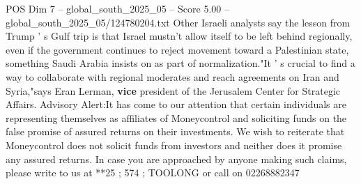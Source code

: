 \begin{textsample}{POS Dim 7 – global\_south\_2025\_05 – Score 5.00 – global\_south\_2025\_05/124780204.txt}
Other Israeli analysts say the lesson from Trump ' s Gulf trip is that Israel mustn't allow itself to be left behind regionally, even if the government continues to reject movement toward a Palestinian state, something Saudi Arabia insists on as part of normalization."It ' s crucial to find a way to collaborate with regional moderates and reach agreements on Iran and Syria,"says Eran Lerman, \textbf{vice} president of the Jerusalem Center for Strategic Affairs.
Advisory Alert:It has come to our attention that certain individuals are representing themselves as affiliates of Moneycontrol and soliciting funds on the false promise of assured returns on their investments.
We wish to reiterate that Moneycontrol does not solicit funds from investors and neither does it promise any assured returns.
In case you are approached by anyone making such claims, please write to us at **25 ; 574 ; TOOLONG or call on 02268882347

\end{textsample}
